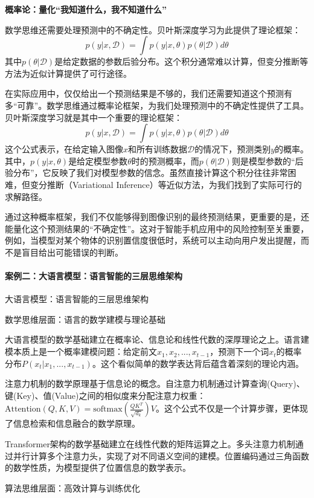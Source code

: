 \textbf{概率论：量化“我知道什么，我不知道什么”}

数学思维还需要处理预测中的不确定性。贝叶斯深度学习为此提供了理论框架：
$$p(y|x, \mathcal{D}) = \int p(y|x, \theta) p(\theta|\mathcal{D}) d\theta$$
其中$p(\theta|\mathcal{D})$是给定数据的参数后验分布。这个积分通常难以计算，但变分推断等方法为近似计算提供了可行途径。

在实际应用中，仅仅给出一个预测结果是不够的，我们还需要知道这个预测有多“可靠”。数学思维通过概率论框架，为我们处理预测中的不确定性提供了工具。贝叶斯深度学习就是其中一个重要的理论框架：
$$p(y|x, \mathcal{D}) = \int p(y|x, \theta) p(\theta|\mathcal{D}) d\theta$$
这个公式表示，在给定输入图像$x$和所有训练数据$\mathcal{D}$的情况下，预测类别$y$的概率。其中，$p(y|x, \theta)$是给定模型参数$\theta$时的预测概率，而$p(\theta|\mathcal{D})$则是模型参数的“后验分布”，它反映了我们对模型参数的信念。虽然直接计算这个积分往往非常困难，但变分推断（Variational Inference）等近似方法，为我们找到了实际可行的求解路径。

通过这种概率框架，我们不仅能够得到图像识别的最终预测结果，更重要的是，还能量化这个预测结果的“不确定性”。这对于智能手机应用中的风险控制至关重要，例如，当模型对某个物体的识别置信度很低时，系统可以主动向用户发出提醒，而不是盲目给出可能错误的判断。


\paragraph{案例二：大语言模型：语言智能的三层思维架构}

大语言模型：语言智能的三层思维架构

数学思维层面：语言的数学建模与理论基础

大语言模型的数学基础建立在概率论、信息论和线性代数的深厚理论之上。语言建模本质上是一个概率建模问题：给定前文$x_1, x_2, ..., x_{t-1}$，预测下一个词$x_t$的概率分布$P(x_t|x_1, ..., x_{t-1})$。这个看似简单的数学表达背后蕴含着深刻的理论内涵。

注意力机制的数学原理基于信息论的概念。自注意力机制通过计算查询(Query)、键(Key)、值(Value)之间的相似度来分配注意力权重：$\text{Attention}(Q,K,V) = \text{softmax}(\frac{QK^T}{\sqrt{d_k}})V$。这个公式不仅是一个计算步骤，更体现了信息检索和信息融合的数学原理。

Transformer架构的数学基础建立在线性代数的矩阵运算之上。多头注意力机制通过并行计算多个注意力头，实现了对不同语义空间的建模。位置编码通过三角函数的数学性质，为模型提供了位置信息的数学表示。

算法思维层面：高效计算与训练优化

